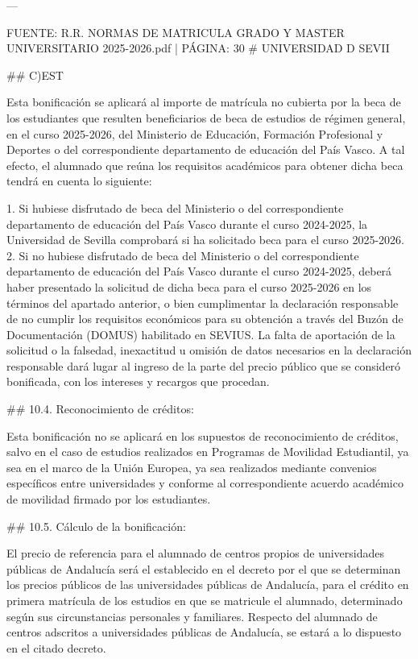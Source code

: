 \documentclass{article}
\begin{document}
\begin{itemize}
\begin{itemize}
\begin{scriptsize}
                  ---

                  FUENTE: R.R. NORMAS DE MATRICULA GRADO Y MASTER UNIVERSITARIO 2025-2026.pdf | PÁGINA: 30
                  \# UNIVERSIDAD D SEVII

                  \#\# C)EST

                  Esta bonificación se aplicará al importe de matrícula no cubierta por la beca de los estudiantes que resulten beneficiarios de beca de estudios de régimen general, en el curso 2025-2026, del Ministerio de Educación, Formación Profesional y Deportes o del correspondiente departamento de educación del País Vasco. A tal efecto, el alumnado que reúna los requisitos académicos para obtener dicha beca tendrá en cuenta lo siguiente:

                  1. Si hubiese disfrutado de beca del Ministerio o del correspondiente departamento de educación del País Vasco durante el curso 2024-2025, la Universidad de Sevilla comprobará si ha solicitado beca para el curso 2025-2026.
                  2. Si no hubiese disfrutado de beca del Ministerio o del correspondiente departamento de educación del País Vasco durante el curso 2024-2025, deberá haber presentado la solicitud de dicha beca para el curso 2025-2026 en los términos del apartado anterior, o bien cumplimentar la declaración responsable de no cumplir los requisitos económicos para su obtención a través del Buzón de Documentación (DOMUS) habilitado en SEVIUS. La falta de aportación de la solicitud o la falsedad, inexactitud u omisión de datos necesarios en la declaración responsable dará lugar al ingreso de la parte del precio público que se consideró bonificada, con los intereses y recargos que procedan.

                  \#\# 10.4. Reconocimiento de créditos:

                  Esta bonificación no se aplicará en los supuestos de reconocimiento de créditos, salvo en el caso de estudios realizados en Programas de Movilidad Estudiantil, ya sea en el marco de la Unión Europea, ya sea realizados mediante convenios específicos entre universidades y conforme al correspondiente acuerdo académico de movilidad firmado por los estudiantes.

                  \#\# 10.5. Cálculo de la bonificación:

                  El precio de referencia para el alumnado de centros propios de universidades públicas de Andalucía será el establecido en el decreto por el que se determinan los precios públicos de las universidades públicas de Andalucía, para el crédito en primera matrícula de los estudios en que se matricule el alumnado, determinado según sus circunstancias personales y familiares. Respecto del alumnado de centros adscritos a universidades públicas de Andalucía, se estará a lo dispuesto en el citado decreto.


\end{scriptsize}
\end{itemize}
\end{itemize}
\end{document}

